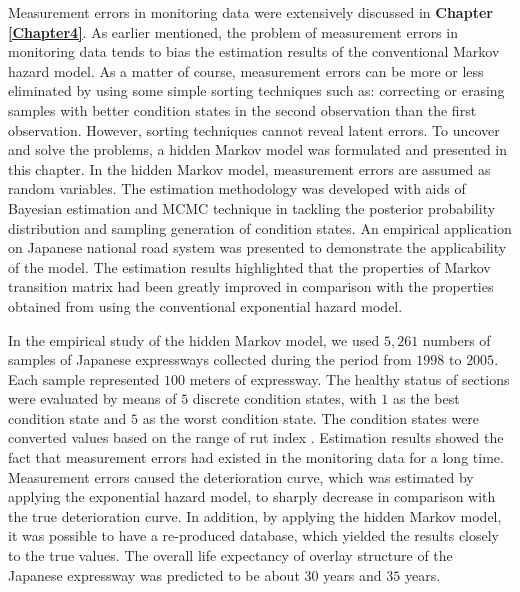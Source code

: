Measurement errors in monitoring data were extensively discussed in \textbf{Chapter \ref{Chapter4}}. As earlier mentioned, the problem of measurement errors in monitoring data  tends to bias the estimation results of the conventional Markov hazard model. As a matter of course, measurement errors can be more or less eliminated by using some simple sorting techniques such as: correcting or erasing samples with better condition states in the second observation than the first observation. However, sorting techniques cannot reveal latent errors. To uncover and solve the problems, a hidden Markov model was formulated and presented in this chapter. In the hidden Markov model, measurement errors are assumed as random variables. The estimation methodology was developed with aids of Bayesian estimation and MCMC technique in tackling the posterior probability distribution and sampling generation of condition states. An empirical application on Japanese national road system was presented to demonstrate the applicability of the model. The estimation results highlighted that the properties of Markov transition matrix had been greatly improved in comparison with the properties obtained from using the conventional exponential hazard model.

In the empirical study of the hidden Markov model, we used $5,261$ numbers of samples of Japanese expressways collected during the period from $1998$ to $2005$. Each sample represented $100$ meters of expressway. The healthy status of sections were evaluated by means of $5$ discrete condition states, with $1$ as the best condition state and $5$ as the worst condition state. The condition states were converted values based on the range of  rut index . Estimation results showed the fact that measurement errors had existed in the monitoring data for a long time. Measurement errors caused the deterioration curve, which was estimated by applying the exponential hazard model, to sharply decrease in comparison with the true deterioration curve. In addition, by applying the hidden Markov model, it was possible to have a re-produced database, which yielded the results closely to the true values. The overall life expectancy of overlay structure of the Japanese expressway was predicted to be about $30$ years and $35$ years. 

